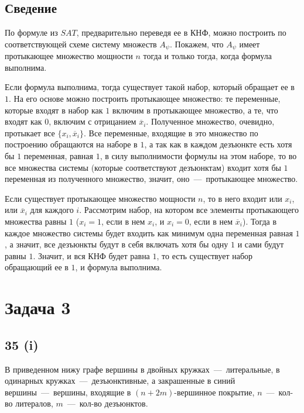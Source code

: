 \documentclass[a4paper,12pt]{article} %
\begin{document}
\subsection{Сведение}
\hspace{5mm}
По формуле из $SAT$, предварительно переведя ее в КНФ, можно построить по соответствующей схеме систему множеств $A_{\psi}$. Покажем, что $A_{\psi}$ имеет протыкающее множество мощности $n$ тогда и только тогда, когда формула выполнима.
 
 Если формула выполнима, тогда существует такой набор, который обращает ее в $1$. На его основе можно построить протыкающее множество: те переменные, которые входят в набор как $1$ включим в протыкающее множество, а те, что входят как $0$, включим с отрицанием $\overline x_i$. Полученное множество, очевидно, протыкает все $\{x_i,\overline x_i\}$. Все переменные, входящие в это множество по построению обращаются на наборе в $1$, а так как в каждом дезъюнкте есть хотя бы $1$ переменная, равная $1$, в силу выполнимости формулы на этом наборе, то во все множества системы (которые соответствуют дезъюнктам) входит хотя бы $1$ переменная из полученного множество, значит, оно~---~протыкающее множество.

Если существует протыкающее множество мощности $n$, то в него входит или $x_i$, или $\overline x_i$ для каждого $i$. Рассмотрим набор, на котором все элементы протыкающего множества равны $1$ ($x_i=1$, если в нем $x_i$, и $x_i=0$, если в нем $\overline x_i$). Тогда в каждое множество системы будет входить как минимум одна переменная равная $1$, а значит, все дезъюнкты будут в себя включать хотя бы одну $1$ и сами будут равны $1$. Значит, и вся КНФ будет равна $1$, то есть существует набор обращающий ее в $1$, и формула выполнима.




\section{Задача 3}
\subsection{35 (i)}
\hspace{5mm}
В приведенном нижу графе вершины в двойных кружках~---~литеральные, в одинарных кружках~---~дезъюнктивные, а закрашенные в синий вершины~---~вершины, входящие в $(n+2m)$-вершинное покрытие, $n$~---~кол-во литералов, $m$~---~кол-во дезъюнктов.
\end{document}
